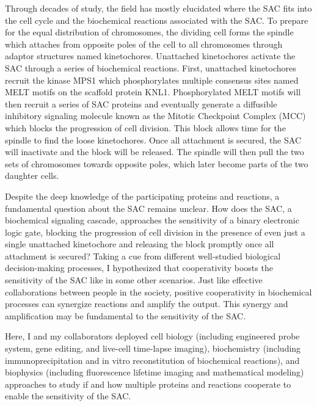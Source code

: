 Through decades of study, the field has mostly elucidated where the SAC fits into the cell cycle and the biochemical reactions associated with the SAC. To prepare for the equal distribution of chromosomes, the dividing cell forms the spindle which attaches from opposite poles of the cell to all chromosomes through adaptor structures named kinetochores. Unattached kinetochores activate the SAC through a series of biochemical reactions. First, unattached kinetochores recruit the kinase MPS1 which phosphorylates multiple consensus sites named MELT motifs on the scaffold protein KNL1. Phosphorylated MELT motifs will then recruit a series of SAC proteins and eventually generate a diffusible inhibitory signaling molecule known as the Mitotic Checkpoint Complex (MCC) which blocks the progression of cell division. This block allows time for the spindle to find the loose kinetochores. Once all attachment is secured, the SAC will inactivate and the block will be released. The spindle will then pull the two sets of chromosomes towards opposite poles, which later become parts of the two daughter cells.

Despite the deep knowledge of the participating proteins and reactions, a fundamental question about the SAC remains unclear. How does the SAC, a biochemical signaling cascade, approaches the sensitivity of a binary electronic logic gate, blocking the progression of cell division in the presence of even just a single unattached kinetochore and releasing the block promptly once all attachment is secured? Taking a cue from different well-studied biological decision-making processes, I hypothesized that cooperativity boosts the sensitivity of the SAC like in some other scenarios. Just like effective collaborations between people in the society, positive cooperativity in biochemical processes can synergize reactions and amplify the output. This synergy and amplification may be fundamental to the sensitivity of the SAC.

Here, I and my collaborators deployed cell biology (including engineered probe system, gene editing, and live-cell time-lapse imaging), biochemistry (including immunoprecipitation and in vitro reconstitution of biochemical reactions), and biophysics (including fluorescence lifetime imaging and mathematical modeling) approaches to study if and how multiple proteins and reactions cooperate to enable the sensitivity of the SAC.

